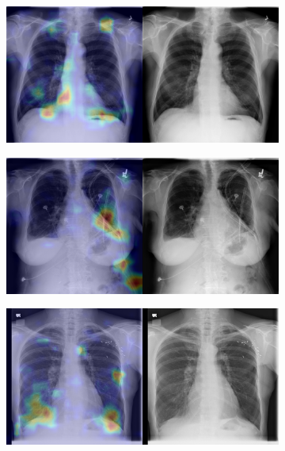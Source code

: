 \begin{figure}[b]
    \centering
    \begin{subfigure}{0.4\textwidth}
        \centering
        \includegraphics[width=1.0\textwidth]{Chapters/5. Conclusiones/img/Emphysema/1_1_00000312_001.png}
    \end{subfigure}
    \begin{subfigure}{0.4\textwidth}
        \centering
        \includegraphics[width=1.0\textwidth]{Chapters/5. Conclusiones/img/Emphysema/1_1_00000732_006.png}
    \end{subfigure}
    \begin{subfigure}{0.4\textwidth}
        \centering
        \includegraphics[width=1.0\textwidth]{Chapters/5. Conclusiones/img/Emphysema/1_1_00001093_000.png}

\end{subfigure}
\end{figure}

